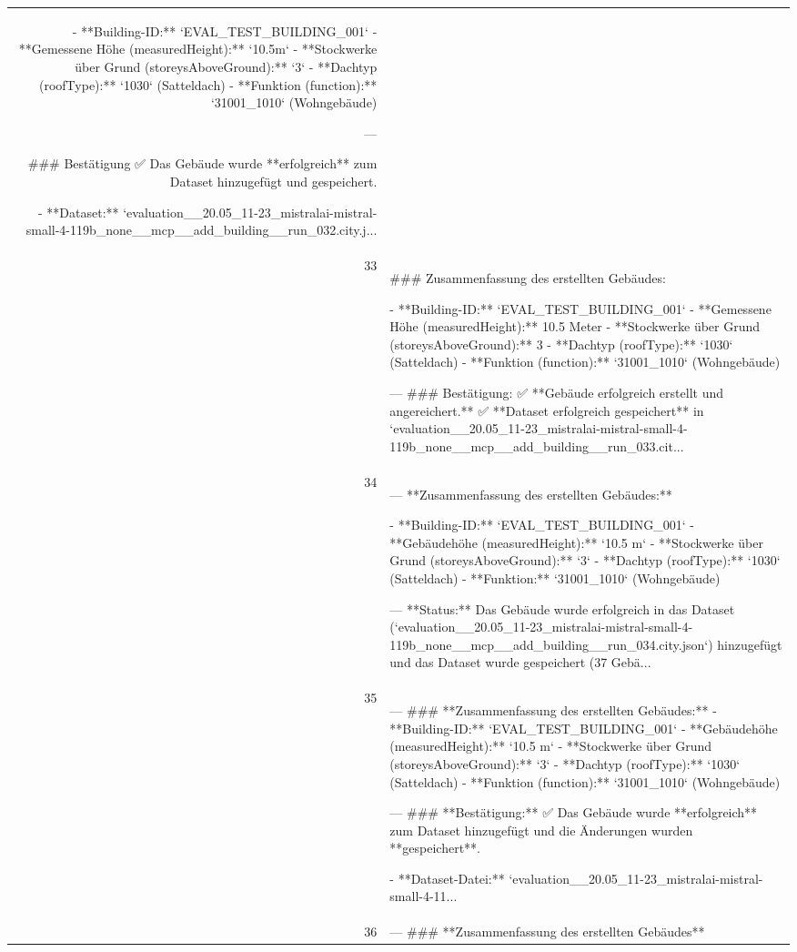 \documentclass[a4paper,11pt]{article}
\begin{document}
\begin{table}[ht]
\begin{tabular}{r p{12cm}}
- **Building-ID:** `EVAL\_TEST\_BUILDING\_001`
- **Gemessene Höhe (measuredHeight):** `10.5m`
- **Stockwerke über Grund (storeysAboveGround):** `3`
- **Dachtyp (roofType):** `1030` (Satteldach)
- **Funktion (function):** `31001\_1010` (Wohngebäude)

---

\#\#\# Bestätigung
✅ Das Gebäude wurde **erfolgreich** zum Dataset hinzugefügt und gespeichert.

- **Dataset:** `evaluation\_\_20.05\_11-23\_mistralai-mistral-small-4-119b\_none\_\_mcp\_\_add\_building\_\_run\_032.city.j... \\
33 & \#\#\# Zusammenfassung des erstellten Gebäudes:

- **Building-ID:** `EVAL\_TEST\_BUILDING\_001`
- **Gemessene Höhe (measuredHeight):** 10.5 Meter
- **Stockwerke über Grund (storeysAboveGround):** 3
- **Dachtyp (roofType):** `1030` (Satteldach)
- **Funktion (function):** `31001\_1010` (Wohngebäude)

---
\#\#\# Bestätigung:
✅ **Gebäude erfolgreich erstellt und angereichert.**
✅ **Dataset erfolgreich gespeichert** in `evaluation\_\_20.05\_11-23\_mistralai-mistral-small-4-119b\_none\_\_mcp\_\_add\_building\_\_run\_033.cit... \\
34 & ---
**Zusammenfassung des erstellten Gebäudes:**

- **Building-ID:** `EVAL\_TEST\_BUILDING\_001`
- **Gebäudehöhe (measuredHeight):** `10.5 m`
- **Stockwerke über Grund (storeysAboveGround):** `3`
- **Dachtyp (roofType):** `1030` (Satteldach)
- **Funktion:** `31001\_1010` (Wohngebäude)

---
**Status:**
Das Gebäude wurde erfolgreich in das Dataset (`evaluation\_\_20.05\_11-23\_mistralai-mistral-small-4-119b\_none\_\_mcp\_\_add\_building\_\_run\_034.city.json`) hinzugefügt und das Dataset wurde gespeichert (37 Gebä... \\
35 & ---
\#\#\# **Zusammenfassung des erstellten Gebäudes:**
- **Building-ID:** `EVAL\_TEST\_BUILDING\_001`
- **Gebäudehöhe (measuredHeight):** `10.5 m`
- **Stockwerke über Grund (storeysAboveGround):** `3`
- **Dachtyp (roofType):** `1030` (Satteldach)
- **Funktion (function):** `31001\_1010` (Wohngebäude)

---
\#\#\# **Bestätigung:**
✅ Das Gebäude wurde **erfolgreich** zum Dataset hinzugefügt und die Änderungen wurden **gespeichert**.

- **Dataset-Datei:** `evaluation\_\_20.05\_11-23\_mistralai-mistral-small-4-11... \\
36 & ---
\#\#\# **Zusammenfassung des erstellten Gebäudes**


\end{tabular}
\end{table}
\end{document}
